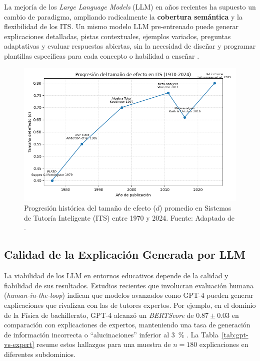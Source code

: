 La mejoría de los \emph{Large Language Models} (LLM) en años recientes ha supuesto un cambio de paradigma, ampliando radicalmente la \textbf{cobertura semántica} y la flexibilidad de los ITS. Un mismo modelo LLM pre-entrenado puede generar explicaciones detalladas, pistas contextuales, ejemplos variados, preguntas adaptativas y evaluar respuestas abiertas, sin la necesidad de diseñar y programar plantillas específicas para cada concepto o habilidad a enseñar \cite{Holmes2022,Zawacki2019}.

\begin{figure}[H]
  \centering
  \includegraphics[width=15cm]{Ilustraciones/Progresión del tamaño de efecto (d) en ITS (1970-2024).png}
  \caption{Progresión histórica del tamaño de efecto (\(d\)) promedio en Sistemas de Tutoría Inteligente (ITS) entre 1970 y 2024. Fuente: Adaptado de \cite{Kulik2016,Woolf2021}.}
  \label{fig:evolucion-its}
\end{figure}

\subsection{Calidad de la Explicación Generada por LLM}
\label{ssec:calidad_explicacion_llm}

La viabilidad de los LLM en entornos educativos depende de la calidad y fiabilidad de sus resultados. Estudios recientes que involucran evaluación humana (\emph{human-in-the-loop}) indican que modelos avanzados como GPT-4 pueden generar explicaciones que rivalizan con las de tutores expertos. Por ejemplo, en el dominio de la Física de bachillerato, GPT-4 alcanzó un \emph{BERTScore} de \(0.87 \pm 0.03\) en comparación con explicaciones de expertos, manteniendo una tasa de generación de información incorrecta o ``alucinaciones''
 inferior al \SI{3}{\percent} \cite{Dempere2023}. La Tabla~\ref{tab:gpt-vs-expert} resume estos hallazgos para una muestra de \(n=180\) explicaciones en diferentes subdominios.

